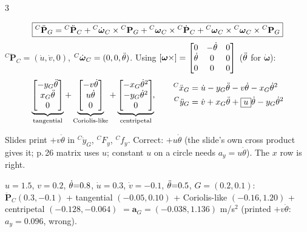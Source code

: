 \begin{multicols}{3}
\begin{deriv}[acceleration \pg{22}]
\end{deriv}
\begin{fbx}
\[\boxed{{}^C\ddot{\mathbf P}_G={}^C\ddot{\mathbf P}_C+{}^C\dot{\boldsymbol\omega}_C\times{}^{C}\mathbf P_G+{}^C\boldsymbol\omega_C\times{}^C\dot{\mathbf P}_C+{}^C\boldsymbol\omega_C\times{}^C\boldsymbol\omega_C\times{}^{C}\mathbf P_G}\]
${}^C\ddot{\mathbf P}_C=(\dot u,\dot v,0)$, ${}^C\dot{\boldsymbol\omega}_C=(0,0,\ddot\theta)$. Using $[\boldsymbol\omega\times]=\begin{bmatrix}0&-\dot\theta&0\\\dot\theta&0&0\\0&0&0\end{bmatrix}$ ($\ddot\theta$ for $\dot{\boldsymbol\omega}$):
\[\underbrace{\begin{bmatrix}-y_G\ddot\theta\\x_G\ddot\theta\\0\end{bmatrix}}_{\text{tangential}}+\underbrace{\begin{bmatrix}-v\dot\theta\\u\dot\theta\\0\end{bmatrix}}_{\text{Coriolis-like}}+\underbrace{\begin{bmatrix}-x_G\dot\theta^2\\-y_G\dot\theta^2\\0\end{bmatrix}}_{\text{centripetal}}\!,\qquad
\begin{aligned}{}^C\ddot x_G&=\dot u-y_G\ddot\theta-v\dot\theta-x_G\dot\theta^2\\{}^C\ddot y_G&=\dot v+x_G\ddot\theta+\boxed{u}\dot\theta-y_G\dot\theta^2\end{aligned}\]
\end{fbx}
\begin{slideerr}
Slides print $+v\dot\theta$ in ${}^C\ddot y_G$, ${}^CF_y$, ${}^Cf_y$. Correct: $+u\dot\theta$ (the slide's own cross product gives it; p.\,26 matrix uses $u$; constant $u$ on a circle needs $a_y=u\dot\theta$). The $x$ row is right. \chk
\end{slideerr}
\begin{worked}
$u{=}1.5$, $v{=}0.2$, $\dot\theta{=}0.8$, $\dot u{=}0.3$, $\dot v{=}{-}0.1$, $\ddot\theta{=}0.5$, $G{=}(0.2,0.1)$: $\ddot{\mathbf P}_C(0.3,-0.1)$ + tangential $(-0.05,0.10)$ + Coriolis-like $(-0.16,1.20)$ + centripetal $(-0.128,-0.064)$ $=\mathbf a_G=(\mathbf{-0.038},\mathbf{1.136})$ m/s$^2$ (printed $+v\dot\theta$: $a_y{=}0.096$, wrong). \chk
\end{worked}


\end{multicols}
